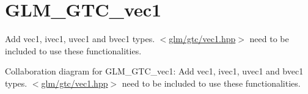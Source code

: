 \hypertarget{group__gtc__vec1}{\section{G\-L\-M\-\_\-\-G\-T\-C\-\_\-vec1}
\label{group__gtc__vec1}
}


Add vec1, ivec1, uvec1 and bvec1 types. $<$\hyperlink{vec1_8hpp}{glm/gtc/vec1.\-hpp}$>$ need to be included to use these functionalities.  


Collaboration diagram for G\-L\-M\-\_\-\-G\-T\-C\-\_\-vec1\-:
Add vec1, ivec1, uvec1 and bvec1 types. $<$\hyperlink{vec1_8hpp}{glm/gtc/vec1.\-hpp}$>$ need to be included to use these functionalities. 